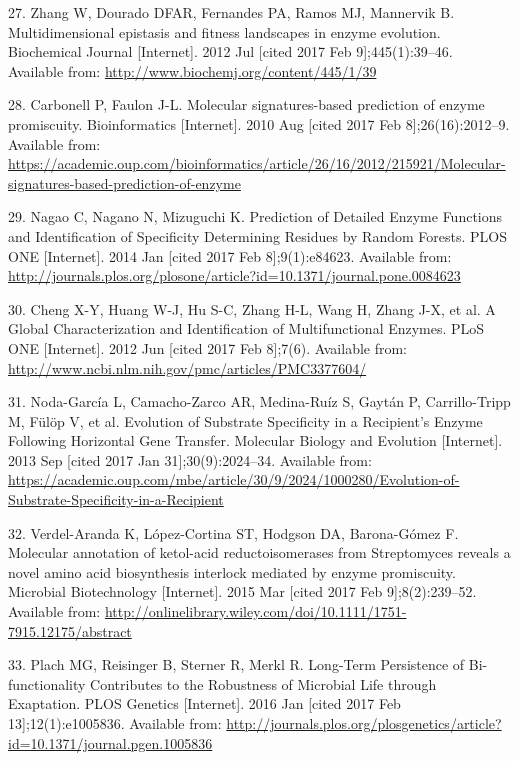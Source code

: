 \documentclass[12pt,twoside]{reedthesis}
\begin{document}
  \hypertarget{ref-zhang_multidimensional_2012}{}
  27. Zhang W, Dourado DFAR, Fernandes PA, Ramos MJ, Mannervik B.
  Multidimensional epistasis and fitness landscapes in enzyme evolution.
  Biochemical Journal {[}Internet{]}. 2012 Jul {[}cited 2017 Feb
  9{]};445(1):39--46. Available from:
  \url{http://www.biochemj.org/content/445/1/39}
  
  \hypertarget{ref-carbonell_molecular_2010}{}
  28. Carbonell P, Faulon J-L. Molecular signatures-based prediction of
  enzyme promiscuity. Bioinformatics {[}Internet{]}. 2010 Aug {[}cited
  2017 Feb 8{]};26(16):2012--9. Available from:
  \url{https://academic.oup.com/bioinformatics/article/26/16/2012/215921/Molecular-signatures-based-prediction-of-enzyme}
  
  \hypertarget{ref-nagao_prediction_2014}{}
  29. Nagao C, Nagano N, Mizuguchi K. Prediction of Detailed Enzyme
  Functions and Identification of Specificity Determining Residues by
  Random Forests. PLOS ONE {[}Internet{]}. 2014 Jan {[}cited 2017 Feb
  8{]};9(1):e84623. Available from:
  \url{http://journals.plos.org/plosone/article?id=10.1371/journal.pone.0084623}
  
  \hypertarget{ref-cheng_global_2012}{}
  30. Cheng X-Y, Huang W-J, Hu S-C, Zhang H-L, Wang H, Zhang J-X, et al. A
  Global Characterization and Identification of Multifunctional Enzymes.
  PLoS ONE {[}Internet{]}. 2012 Jun {[}cited 2017 Feb 8{]};7(6). Available
  from: \url{http://www.ncbi.nlm.nih.gov/pmc/articles/PMC3377604/}
  
  \hypertarget{ref-noda-garcia_evolution_2013}{}
  31. Noda-García L, Camacho-Zarco AR, Medina-Ruíz S, Gaytán P,
  Carrillo-Tripp M, Fülöp V, et al. Evolution of Substrate Specificity in
  a Recipient's Enzyme Following Horizontal Gene Transfer. Molecular
  Biology and Evolution {[}Internet{]}. 2013 Sep {[}cited 2017 Jan
  31{]};30(9):2024--34. Available from:
  \url{https://academic.oup.com/mbe/article/30/9/2024/1000280/Evolution-of-Substrate-Specificity-in-a-Recipient}
  
  \hypertarget{ref-verdel-aranda_molecular_2015}{}
  32. Verdel-Aranda K, López-Cortina ST, Hodgson DA, Barona-Gómez F.
  Molecular annotation of ketol-acid reductoisomerases from Streptomyces
  reveals a novel amino acid biosynthesis interlock mediated by enzyme
  promiscuity. Microbial Biotechnology {[}Internet{]}. 2015 Mar {[}cited
  2017 Feb 9{]};8(2):239--52. Available from:
  \url{http://onlinelibrary.wiley.com/doi/10.1111/1751-7915.12175/abstract}
  
  \hypertarget{ref-plach_long-term_2016}{}
  33. Plach MG, Reisinger B, Sterner R, Merkl R. Long-Term Persistence of
  Bi-functionality Contributes to the Robustness of Microbial Life through
  Exaptation. PLOS Genetics {[}Internet{]}. 2016 Jan {[}cited 2017 Feb
  13{]};12(1):e1005836. Available from:
  \url{http://journals.plos.org/plosgenetics/article?id=10.1371/journal.pgen.1005836}
  
\end{document}

